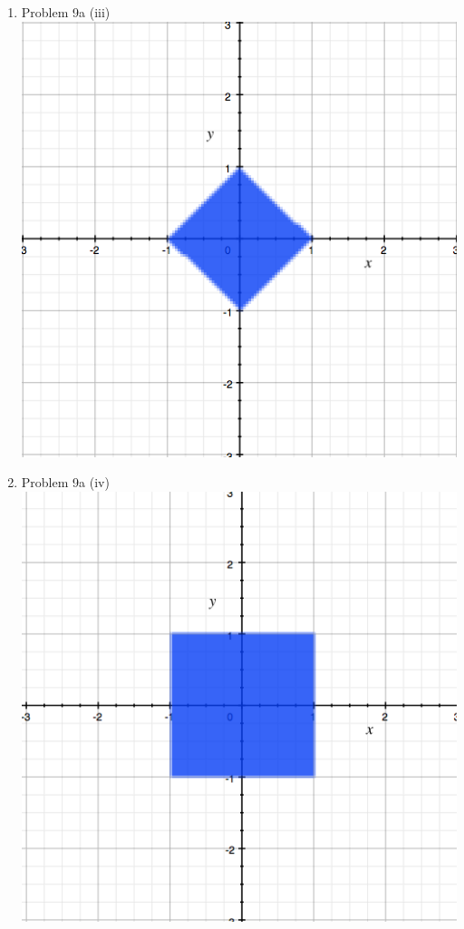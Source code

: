 \documentclass[11pt]{article}
\newcommand{\solution}[1]{{{\color{blue}{\bf Solution:} {#1}}}}
\begin{document}
\begin{enumerate}
\item Problem 9a (iii) 
\solution{}
\newline
\includegraphics[scale=0.4]{9a(iii)}

\item Problem 9a (iv)
\solution{}
\newline
\includegraphics[scale=0.4]{9a(iv)}

\end{enumerate}
\end{document}
